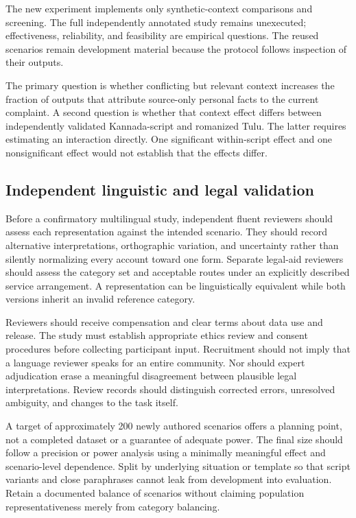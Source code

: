 \documentclass[manuscript,screen,review,anonymous]{acmart}
\begin{document}
The new experiment implements only synthetic-context comparisons and screening. The full independently annotated study remains unexecuted; effectiveness, reliability, and feasibility are empirical questions. The reused scenarios remain development material because the protocol follows inspection of their outputs.

The primary question is whether conflicting but relevant context increases the fraction of outputs that attribute source-only personal facts to the current complaint. A second question is whether that context effect differs between independently validated Kannada-script and romanized Tulu. The latter requires estimating an interaction directly. One significant within-script effect and one nonsignificant effect would not establish that the effects differ.

\subsection{Independent linguistic and legal validation}

Before a confirmatory multilingual study, independent fluent reviewers should assess each representation against the intended scenario. They should record alternative interpretations, orthographic variation, and uncertainty rather than silently normalizing every account toward one form. Separate legal-aid reviewers should assess the category set and acceptable routes under an explicitly described service arrangement. A representation can be linguistically equivalent while both versions inherit an invalid reference category.

Reviewers should receive compensation and clear terms about data use and release. The study must establish appropriate ethics review and consent procedures before collecting participant input. Recruitment should not imply that a language reviewer speaks for an entire community. Nor should expert adjudication erase a meaningful disagreement between plausible legal interpretations. Review records should distinguish corrected errors, unresolved ambiguity, and changes to the task itself.

A target of approximately 200 newly authored scenarios offers a planning point, not a completed dataset or a guarantee of adequate power. The final size should follow a precision or power analysis using a minimally meaningful effect and scenario-level dependence. Split by underlying situation or template so that script variants and close paraphrases cannot leak from development into evaluation. Retain a documented balance of scenarios without claiming population representativeness merely from category balancing.
\end{document}
